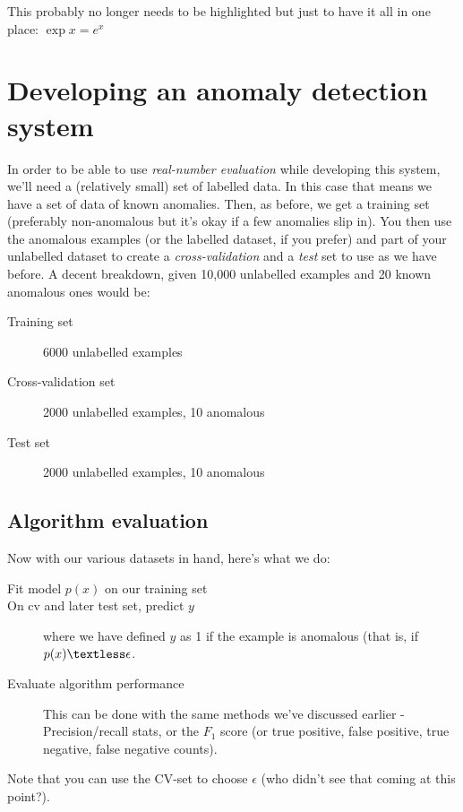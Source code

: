 This probably no longer needs to be highlighted but just to have it all in one place: $\exp{x} = e^x$

\section{Developing an anomaly detection system}

In order to be able to use \emph{real-number evaluation} while developing this system, we'll need a (relatively small) set of labelled data. In this case that means we have a set of data of known anomalies. Then, as before, we get a training set (preferably non-anomalous but it's okay if a few anomalies slip in).
You then use the anomalous examples (or the labelled dataset, if you prefer) and part of your unlabelled dataset to create a \emph{cross-validation} and a \emph{test} set to use as we have before. A decent breakdown, given 10,000 unlabelled examples and 20 known anomalous ones would be:

\begin{description}
\item[Training set] 6000 unlabelled examples
\item[Cross-validation set] 2000 unlabelled examples, 10 anomalous
\item[Test set] 2000 unlabelled examples, 10 anomalous
\end{description}

\subsection{Algorithm evaluation}

Now with our various datasets in hand, here's what we do:

\begin{description}
\item[Fit model $p(x)$ on our training set]
\item[On cv and later test set, predict $y$] where we have defined $y$ as 1 if the example is anomalous (that is, if $p(x) \textless \epsilon$.
\item[Evaluate algorithm performance] This can be done with the same methods we've discussed earlier - Precision/recall stats, or the $F_1$ score (or true positive, false positive, true negative, false negative counts).
\end{description}
Note that you can use the CV-set to choose $\epsilon$ (who didn't see that coming at this point?).

